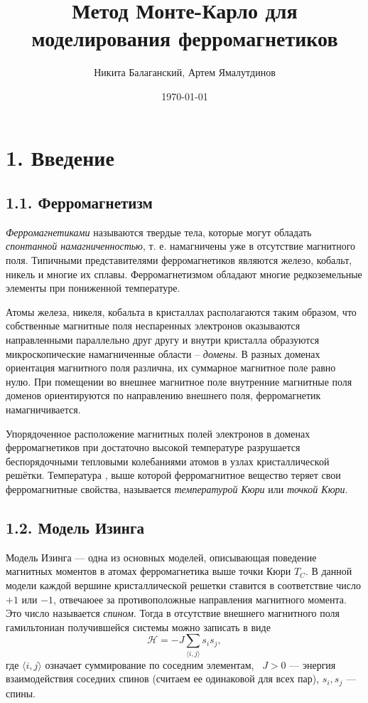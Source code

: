 \documentclass[12pt]{report}
\title{Метод Монте-Карло для моделирования ферромагнетиков}
\author{Никита Балаганский, Артем Ямалутдинов}
\date{\today}
\theoremstyle{definition}
\begin{document}
\maketitle
{}
%
\thispagestyle{fancy}
\newpage
\chapter{1. Введение}
\section{1.1. Ферромагнетизм}
\emph{Ферромагнетиками} называются твердые тела, которые могут обладать \emph{спонтанной намагниченностью}, т. е. намагничены уже в отсутствие магнитного поля.
Типичными представителями ферромагнетиков являются железо, кобальт, никель и многие их сплавы. Ферромагнетизмом обладают многие редкоземельные элементы при пониженной температуре.

Атомы железа, никеля, кобальта в кристаллах располагаются таким образом, что собственные магнитные поля неспаренных электронов оказываются направленными параллельно друг другу и внутри кристалла образуются микроскопические намагниченные области – \emph{домены}.
В разных доменах ориентация магнитного поля различна, их суммарное магнитное поле равно нулю. 
При помещении во внешнее магнитное поле внутренние магнитные поля доменов ориентируются по направлению внешнего поля, ферромагнетик намагничивается.

Упорядоченное расположение магнитных полей электронов в доменах ферромагнетиков при достаточно высокой температуре разрушается беспорядочными тепловыми колебаниями атомов в узлах кристаллической решётки.
Температура , выше которой ферромагнитное вещество теряет свои ферромагнитные свойства, называется \emph{температурой Кюри} или \emph{точкой Кюри}.

\section{1.2. Модель Изинга}
Модель Изинга --- одна из основных моделей, описывающая поведение магнитных моментов 
в атомах ферромагнетика выше точки Кюри $T_C$. В данной модели каждой вершине кристаллической решетки ставится в соответствие число $+1$ или $-1$, 
отвечаюее за противоположные направления магнитного момента. Это число называется \emph{спином}. Тогда в отсутствие внешнего магнитного поля гамильтониан получившейся системы можно записать в виде
\begin{equation}\label{eq:energy}
    \mathcal{H} = -J\sum_{\langle i, j \rangle}s_is_j,
\end{equation}
где $\langle i, j \rangle$ означает суммирование по соседним элементам,  $J > 0$ --- энергия взаимодействия соседних спинов (считаем ее одинаковой для всех пар),
$s_i, s_j$ --- спины.
\end{document}

